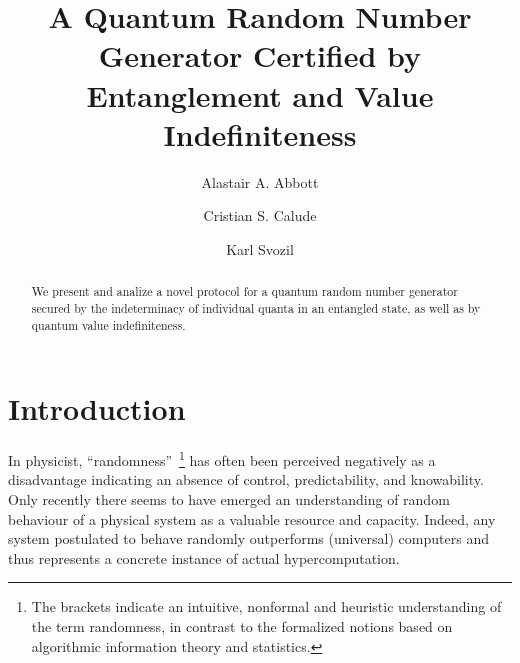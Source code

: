 \documentclass[%
 preprint,
 showpacs,
 showkeys,
 preprintnumbers,
  amsmath,amssymb,
  aps,
 pra,
  longbibliography,
  floatfix,
 ]{revtex4-1}
\theoremstyle{definition}
\begin{document}

\title{A Quantum Random Number Generator Certified by Entanglement and Value Indefiniteness}

\author{Alastair A. Abbott}
\author{Cristian S. Calude}

\author{Karl Svozil}

\begin{abstract}
We present and analize a novel protocol for a quantum random number generator secured by the indeterminacy of individual quanta in an entangled state, as well as by quantum value indefiniteness.
\end{abstract}




\maketitle

\section{Introduction}

In physicist, ``randomness''~\footnote{The brackets indicate an intuitive, nonformal and heuristic understanding of the term randomness,
in contrast to the formalized notions based on algorithmic information theory and statistics.}
has often been perceived negatively as a disadvantage indicating an absence of control, predictability, and knowability.
Only recently there seems to have emerged an understanding of random behaviour of a physical system as a valuable resource and capacity.
Indeed, any system postulated to behave randomly outperforms (universal) computers and thus represents a concrete instance of actual hypercomputation.
\end{document}
